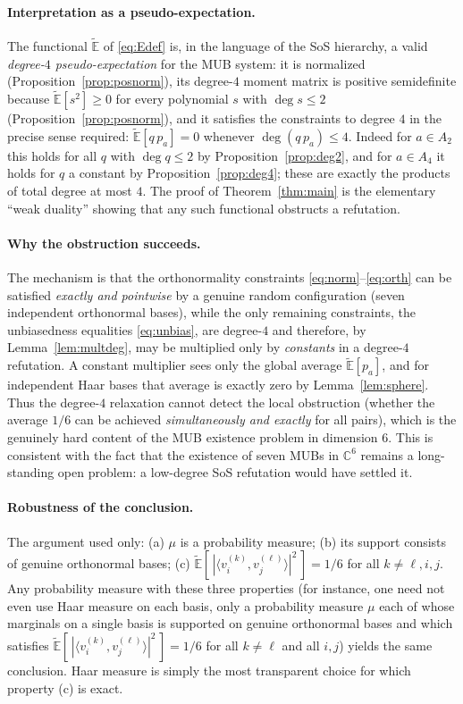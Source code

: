 \documentclass{amsart}
\theoremstyle{definition}
\theoremstyle{remark}
\begin{document}
\paragraph{Interpretation as a pseudo-expectation.}
The functional $\widetilde{\mathbb{E}}$ of \eqref{eq:Edef} is, in the language of the SoS
hierarchy, a valid \emph{degree-$4$ pseudo-expectation} for the MUB system: it is normalized
(Proposition~\ref{prop:posnorm}), its degree-$4$ moment matrix is positive semidefinite
because $\widetilde{\mathbb{E}}[s^2]\ge0$ for every polynomial $s$ with $\deg s\le2$
(Proposition~\ref{prop:posnorm}), and it satisfies the constraints to degree $4$ in the precise
sense required: $\widetilde{\mathbb{E}}[q\,p_a]=0$ whenever $\deg(q\,p_a)\le4$. Indeed for
$a\in A_2$ this holds for all $q$ with $\deg q\le2$ by Proposition~\ref{prop:deg2}, and for
$a\in A_4$ it holds for $q$ a constant by Proposition~\ref{prop:deg4}; these are exactly the
products of total degree at most $4$. The proof of Theorem~\ref{thm:main} is the elementary
``weak duality'' showing that any such functional obstructs a refutation.

\paragraph{Why the obstruction succeeds.}
The mechanism is that the orthonormality constraints \eqref{eq:norm}--\eqref{eq:orth} can be
satisfied \emph{exactly and pointwise} by a genuine random configuration (seven independent
orthonormal bases), while the only remaining constraints, the unbiasedness equalities
\eqref{eq:unbias}, are degree-$4$ and therefore, by Lemma~\ref{lem:multdeg}, may be multiplied
only by \emph{constants} in a degree-$4$ refutation. A constant multiplier sees only the global
average $\widetilde{\mathbb{E}}[p_a]$, and for independent Haar bases that average is exactly
zero by Lemma~\ref{lem:sphere}. Thus the degree-$4$ relaxation cannot detect the local
obstruction (whether the average $1/6$ can be achieved \emph{simultaneously and exactly} for
all pairs), which is the genuinely hard content of the MUB existence problem in dimension $6$.
This is consistent with the fact that the existence of seven MUBs in $\mathbb{C}^6$ remains a
long-standing open problem: a low-degree SoS refutation would have settled it.

\paragraph{Robustness of the conclusion.}
The argument used only: (a) $\mu$ is a probability measure; (b) its support consists of genuine
orthonormal bases; (c) $\widetilde{\mathbb{E}}[\,|\langle v^{(k)}_i,v^{(\ell)}_j\rangle|^2\,]=1/6$
for all $k\ne\ell,i,j$. Any probability measure with these three properties (for instance, one
need not even use Haar measure on each basis, only a probability measure $\mu$ each of whose
marginals on a single basis is supported on genuine orthonormal bases and which satisfies
$\widetilde{\mathbb{E}}[\,|\langle v^{(k)}_i,v^{(\ell)}_j\rangle|^2\,]=1/6$ for all
$k\ne\ell$ and all $i,j$) yields the same conclusion. Haar measure is simply the most transparent choice for which
property (c) is exact.
\end{document}
